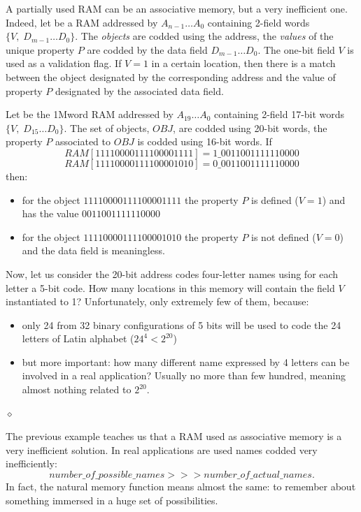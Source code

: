 A partially used RAM can be an associative memory, but a very
inefficient one. Indeed, let be a RAM addressed by $A_{n-1} \ldots
A_{0}$ containing 2-field words $\{V, \; D_{m-1} \ldots D_{0}\}$.
The {\em objects} are codded using the address, the {\em values}
of the unique property $P$ are codded by the data field $D_{m-1}
\ldots D_{0}$. The one-bit field $V$ is used as a validation flag.
If $V=1$ in a certain location, then there is a match between the
object designated by the corresponding address and the value of
property $P$ designated by the associated data field.

\begin{exemplu}
Let be the 1Mword RAM addressed by $A_{19} \ldots A_{0}$
containing 2-field 17-bit words $\{V, \; D_{15} \ldots D_{0}\}$.
The set of objects, $OBJ$, are codded using 20-bit words, the
property $P$ associated to $OBJ$ is codded using 16-bit words. If
$$RAM[11110000111100001111] = 1\_0011001111110000$$
$$RAM[11110000111100001010] = 0\_0011001111110000$$
then:
\begin{itemize}
    \item for the object $11110000111100001111$ the property $P$
    is defined ($V=1$) and has the value $0011001111110000$
    \item for the object $11110000111100001010$ the property $P$
    is not defined ($V=0$) and the data field is meaningless.
\end{itemize}
Now, let us consider the 20-bit address codes four-letter names
using for each letter a 5-bit code. How many locations in this
memory will contain the field $V$ instantiated to 1?
Unfortunately, only extremely few of them, because:
\begin{itemize}
    \item only 24 from 32 binary configurations of 5 bits will be
    used to code the 24 letters of Latin alphabet ($24^{4} <
    2^{20}$)
    \item but more important: how many different name expressed by 4
    letters can be involved in a real application? Usually no more
    than few hundred, meaning almost nothing related to $2^{20}$.
\end{itemize}
 $\diamond$
\end{exemplu}

The previous example teaches us that a RAM used as associative
memory is a very inefficient solution. In real applications are
used names codded very inefficiently:
$$number\_of\_possible\_names >>> number\_of\_actual\_names.$$
In fact, the natural memory function means almost the same: to
remember about something immersed in a huge set of possibilities.

